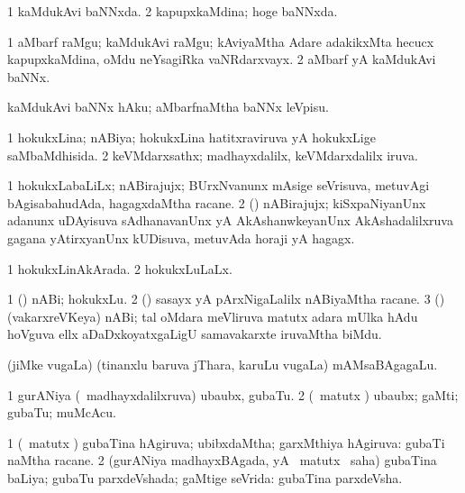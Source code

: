 {\bentry
{} 
\gl{\gu}
\expl{}
\bmng
\bnum
\num{1} kaMdukAvi baNNxda. 
\num{2} kapupxkaMdina; hoge baNNxda. 
\enum
\emng
\eentry

\bentry
{} 
\gl{\nA}
\expl{}
\bmng
\bnum
\num{1} aMbarf raMgu; kaMdukAvi raMgu; kAviyaMtha Adare adakikxMta hecucx kapupxkaMdina, oMdu neYsagiRka vaNRdarxvayx. 
\num{2} aMbarf yA kaMdukAvi baNNx. 
\enum
\emng
\eentry

\bentry
{} 
\gl{\sakirx}
\expl{}
\bmng
kaMdukAvi baNNx hAku; aMbarfnaMtha baNNx leVpisu. 
\emng
\eentry

\bentry
{} 
\gl{\gu}
\expl{}
\bmng
\bnum
\num{1} hokukxLina; nABiya; hokukxLina hatitxraviruva yA hokukxLige saMbaMdhisida. 
\num{2} keVMdarxsathx; madhayxdalilx, keVMdarxdalilx iruva. 
\enum
\emng
\eentry

\bentry
{}
\gl{\nA}
\expl{}
\bmng
\bnum
\num{1} hokukxLabaLiLx; nABirajujx; BUrxNvanunx mAsige seVrisuva, metuvAgi bAgisabahudAda, hagagxdaMtha racane. 
\num{2} (\vAyA) nABirajujx; kiSxpaNiyanUnx adanunx uDAyisuva sAdhanavanUnx yA AkAshanwkeyanUnx AkAshadalilxruva gagana yAtirxyanUnx kUDisuva, metuvAda horaji yA hagagx. 
\enum
\emng
\eentry

\bentry
{} 
\gl{\gu}
\expl{}
\bmng
\bnum
\num{1} hokukxLinAkArada. 
\num{2} hokukxLuLaLx. 
\enum
\emng
\eentry

\bentry
{} 
\gl{\nA}
\bmng
\bnum
\num{1} (\aMrashA) nABi; hokukxLu. 
\num{2} (\jiVvi) sasayx yA pArxNigaLalilx nABiyaMtha racane. 
\num{3} (\jAyx) (vakarxreVKeya) nABi; tal oMdara meVliruva matutx adara mUlka hAdu hoVguva ellx aDaDxkoyatxgaLigU samavakarxte iruvaMtha biMdu. 
\enum
\emng
\eentry

\bentry
{} 
\gl{\nA}
\expl{}
\bmng
(jiMke \mo vugaLa) (tinanxlu baruva jThara, karuLu \mo vugaLa) mAMsaBAgagaLu. 
\emng
\eentry

\bentry
{} 
\gl{\nA}
\bmng
\bnum
\num{1} gurANiya (\kanmu\ madhayxdalilxruva) ubaubx, gubaTu. 
\num{2} (\savi\ matutx \pArxvi) ubaubx; gaMti; gubaTu; muMcAcu. 
\enum
\emng
\eentry

\bentry
{} 
\gl{\gu}
\expl{}
\bmng
\bnum
\num{1} (\savi\ matutx \pArxvi) gubaTina hAgiruva; ubibxdaMtha; garxMthiya hAgiruva:  gubaTi naMtha racane. 
\num{2} (gurANiya madhayxBAgada, yA \savi\ matutx \pArxvi\ saha) gubaTina baLiya; gubaTu parxdeVshada; gaMtige seVrida:  gubaTina parxdeVsha. 
\enum
\emng
\eentry

}
